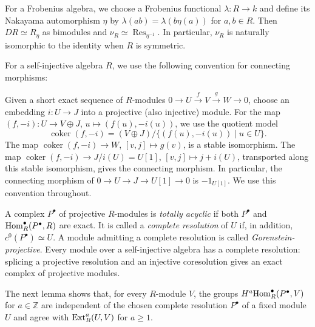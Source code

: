 \documentclass[11pt]{article}
\begin{document}
For a Frobenius algebra, we choose a Frobenius functional $\lambda:R\to k$ and define its Nakayama automorphism $\eta$ by $\lambda(ab)=\lambda(b\eta(a))$ for $a, b\in R$. Then $DR\simeq R_\eta$ as bimodules
and $\nu_R\simeq\operatorname{Res}_{\eta^{-1}}$. In particular, $\nu_R$ is naturally isomorphic to the identity when $R$ is symmetric.

For a self-injective algebra $R$, we use the following convention for
connecting morphisms:

Given a short exact sequence of $R$-modules
$0\to U\xrightarrow{f}V\xrightarrow{g}W\to0$, choose an embedding
$i:U\to J$ into a projective (also injective) module.
For the map $(f,-i):U\to V\oplus J$, $u\mapsto(f(u),-i(u))$, we use the quotient model
\[
 \operatorname{coker}(f,-i)
 =(V\oplus J)/\{(f(u),-i(u))\mid u\in U\}.
\]
The map $\operatorname{coker}(f,-i)\to W$, $[v,j]\mapsto g(v)$,
is a stable isomorphism. The map
$\operatorname{coker}(f,-i)\to J/i(U)=U[1]$,
$[v,j]\mapsto j+i(U)$, transported along this stable isomorphism,
gives the connecting morphism.
In particular, the connecting morphism of
$0\to U\to J\to U[1]\to0$ is $-1_{U[1]}$. We use this convention throughout.

A complex $P^\bullet$ of projective $R$-modules is \emph{totally acyclic}
if both $P^\bullet$ and ${\rm Hom}_R^\bullet(P^\bullet,R)$ are exact. It is called a
\emph{complete resolution} of $U$ if, in addition,
$c^0(P^\bullet)\simeq U$. A module admitting a complete resolution
is called \emph{Gorenstein-projective}. Every module over a self-injective algebra
has a complete resolution: splicing a projective resolution and an injective coresolution gives an exact complex of projective modules.

The next lemma shows that, for every $R$-module $V$, the groups
$H^a{\rm Hom}_R^\bullet(P^\bullet,V)$ for $a\in\mathbb Z$ are independent
of the chosen complete resolution $P^\bullet$ of a fixed module $U$
and agree with ${\rm Ext}_R^a(U,V)$ for $a\ge1$.
\end{document}
